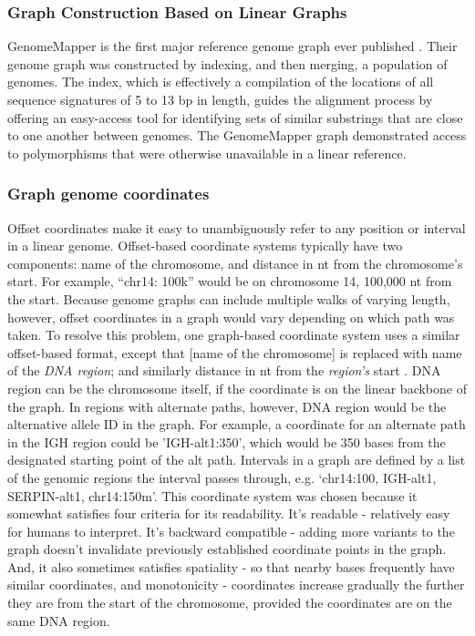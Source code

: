 \subsubsection{Graph Construction Based on Linear Graphs}

GenomeMapper is the first major reference genome graph ever published \cite{Schneeberger_2009}.
Their genome graph was constructed by indexing, and then merging, a population of genomes. 
The index, which is effectively a compilation of the locations of all sequence signatures of 5 to 13 bp in length, guides the alignment process by offering an easy-access tool for identifying sets of similar substrings that are close to one another between genomes. 
The GenomeMapper graph demonstrated access to polymorphisms that were otherwise unavailable in a linear reference.

\subsubsection{Graph genome coordinates}

Offset coordinates make it easy to unambiguously refer to any position or interval in a linear genome.
Offset-based coordinate systems typically have two components: name of the chromosome, and distance in nt from the chromosome's start.
For example, ``chr14: 100k'' would be on chromosome 14, 100,000 nt from the start.
Because genome graphs can include multiple walks of varying length, however, offset coordinates in a graph would vary depending on which path was taken.
To resolve this problem, one graph-based coordinate system uses a similar offset-based format, except that [name of the chromosome] is replaced with name of the \emph{DNA region}; and similarly distance in nt from the \emph{region's} start \cite{Rand_2016}. 
DNA region can be the chromosome itself, if the coordinate is on the linear backbone of the graph.
In regions with alternate paths, however, DNA region would be the alternative allele ID in the graph.
For example, a coordinate for an alternate path in the IGH region could be 'IGH-alt1:350', which would be 350 bases from the designated starting point of the alt path.
Intervals in a graph are defined by a list of the genomic regions the interval passes through, e.g. `chr14:100, IGH-alt1, SERPIN-alt1, chr14:150m'.
This coordinate system was chosen because it somewhat satisfies four criteria for its readability.
It's readable - relatively easy for humans to interpret.
It's backward compatible - adding more variants to the graph doesn't invalidate previously established coordinate points in the graph.
And, it also sometimes satisfies spatiality - so that nearby bases frequently have similar coordinates, and monotonicity - coordinates increase gradually the further they are from the start of the chromosome, provided the coordinates are on the same DNA region.

